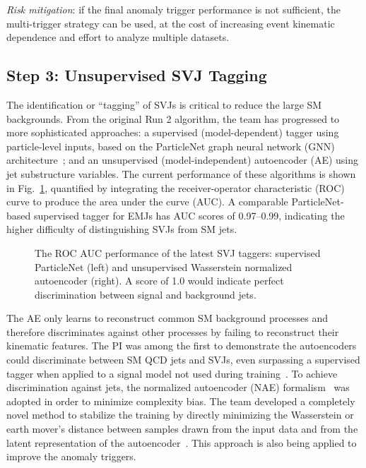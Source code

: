 \textit{Risk mitigation}: if the final anomaly trigger performance is not sufficient, the multi-trigger strategy can be used, at the cost of increasing event kinematic dependence and effort to analyze multiple datasets.

\subsection{Step 3: Unsupervised SVJ Tagging}\label{subsec:tagging}

The identification or ``tagging'' of SVJs is critical to reduce the large SM backgrounds.
From the original Run 2 algorithm, the team has progressed to more sophisticated approaches:
a supervised (model-dependent) tagger using particle-level inputs, based on the ParticleNet graph neural network (GNN) architecture~\cite{Qu:2019gqs};
and an unsupervised (model-independent) autoencoder (AE) using jet substructure variables.
The current performance of these algorithms is shown in Fig.~\ref{fig:svjtaggers}, quantified by integrating the receiver-operator characteristic (ROC) curve to produce the area under the curve (AUC).
A comparable ParticleNet-based supervised tagger for EMJs has AUC scores of 0.97--0.99, indicating the higher difficulty of distinguishing SVJs from SM jets.

\begin{figure}[htb!]
\centering
{}
\caption{The ROC AUC performance of the latest SVJ taggers: supervised ParticleNet (left) and unsupervised Wasserstein normalized autoencoder (right).
A score of 1.0 would indicate perfect discrimination between signal and background jets.}
\label{fig:svjtaggers}
\end{figure}

The AE only learns to reconstruct common SM background processes and therefore discriminates against other processes by failing to reconstruct their kinematic features.
The PI was among the first to demonstrate the autoencoders could discriminate between SM QCD jets and SVJs, even surpassing a supervised tagger when applied to a signal model not used during training~\cite{Canelli:2021aps}.
To achieve discrimination against \ttbar jets, the normalized autoencoder (NAE) formalism~\cite{Dillon:2022mkq} was adopted in order to minimize complexity bias.
The team developed a completely novel method to stabilize the training by directly minimizing the Wasserstein or earth mover's distance
between samples drawn from the input data and from the latent representation of the autoencoder~\cite{Eble:2024tpr}.
This approach is also being applied to improve the anomaly triggers.


